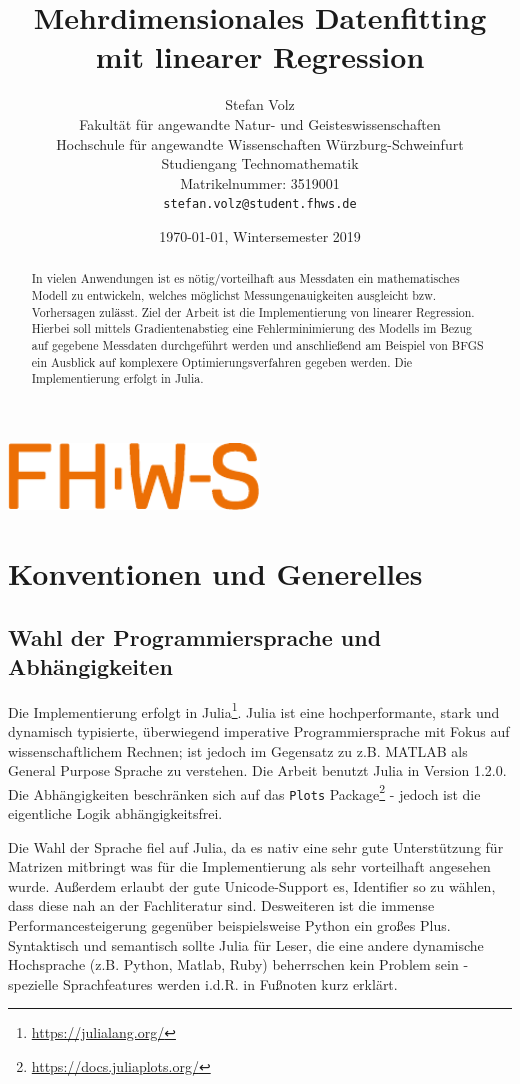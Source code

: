 \documentclass{article}
\title{ Mehrdimensionales Datenfitting mit linearer Regression }
\author{
  Stefan Volz\\
  Fakultät für angewandte Natur- und Geisteswissenschaften\\
  Hochschule für angewandte Wissenschaften Würzburg-Schweinfurt\\
  Studiengang Technomathematik\\
  Matrikelnummer: 3519001\\
  \texttt{stefan.volz@student.fhws.de}\\
}
\date{\today, Wintersemester 2019}
\theoremstyle{plain} %
\theoremstyle{definition} %
\begin{document}
\begin{center}
  \includegraphics[width=0.5\textwidth]{FHWS}  
\end{center}

\maketitle

\begin{abstract}
  In vielen Anwendungen ist es nötig/vorteilhaft aus Messdaten ein mathematisches Modell zu entwickeln, welches möglichst Messungenauigkeiten ausgleicht bzw. Vorhersagen zulässt. Ziel der Arbeit ist die Implementierung von linearer Regression. Hierbei soll mittels Gradientenabstieg eine Fehlerminimierung des Modells im Bezug auf gegebene Messdaten durchgeführt werden und anschließend am Beispiel von BFGS ein Ausblick auf komplexere Optimierungsverfahren gegeben werden. Die Implementierung erfolgt in Julia.
\end{abstract}

\tableofcontents
\newpage

\section{Konventionen und Generelles}
\subsection{Wahl der Programmiersprache und Abhängigkeiten}
Die Implementierung erfolgt in Julia\footnote{\url{https://julialang.org/}}. Julia ist eine hochperformante, stark und dynamisch typisierte, überwiegend imperative Programmiersprache mit Fokus auf wissenschaftlichem Rechnen; ist jedoch im Gegensatz zu z.B. MATLAB als General Purpose Sprache zu verstehen. Die Arbeit benutzt Julia in Version 1.2.0. Die Abhängigkeiten beschränken sich auf das \texttt{Plots} Package\footnote{\url{https://docs.juliaplots.org/}} - jedoch ist die eigentliche Logik abhängigkeitsfrei.

Die Wahl der Sprache fiel auf Julia, da es nativ eine sehr gute Unterstützung für Matrizen mitbringt was für die Implementierung als sehr vorteilhaft angesehen wurde. Außerdem erlaubt der gute Unicode-Support es, Identifier so zu wählen, dass diese nah an der Fachliteratur sind. Desweiteren ist die immense Performancesteigerung gegenüber beispielsweise Python ein großes Plus. Syntaktisch und semantisch sollte Julia für Leser, die eine andere dynamische Hochsprache (z.B. Python, Matlab, Ruby) beherrschen kein Problem sein - spezielle Sprachfeatures werden i.d.R. in Fußnoten kurz erklärt.
\end{document}
